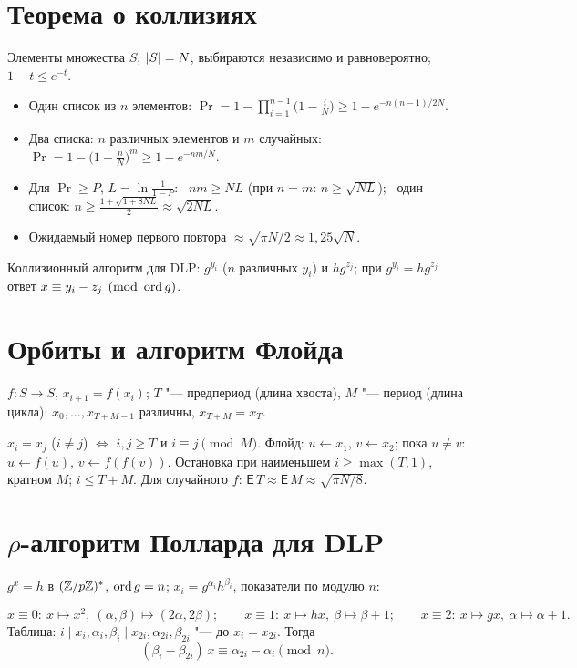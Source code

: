 \documentclass{ca-handout}
\begin{document}
\makehandouttitle

\section{Теорема о коллизиях}
Элементы множества $S$, $\lvert S\rvert = N$, выбираются независимо и равновероятно; $1 - t \le e^{-t}$.
\begin{reminder}[title={Вероятность коллизии}]
\begin{itemize}
  \item Один список из $n$ элементов:
    $\Pr = 1 - \prod_{i=1}^{n-1}\bigl(1 - \frac iN\bigr) \ge 1 - e^{-n(n-1)/2N}$.
  \item Два списка: $n$ различных элементов и $m$ случайных:
    $\Pr = 1 - \bigl(1 - \frac nN\bigr)^m \ge 1 - e^{-nm/N}$.
  \item Для $\Pr \ge P$, $L = \ln\frac{1}{1-P}$: \ $nm \ge NL$ (при $n = m$: $n \ge \sqrt{NL}$);
    \ один список: $n \ge \frac{1 + \sqrt{1 + 8NL}}{2} \approx \sqrt{2NL}$.
  \item Ожидаемый номер первого повтора $\approx \sqrt{\pi N/2} \approx 1{,}25\sqrt N$.
\end{itemize}
\end{reminder}
Коллизионный алгоритм для DLP: $g^{y_i}$ ($n$ различных $y_i$) и $h g^{z_j}$; при
$g^{y_i} = h g^{z_j}$ ответ $x \equiv y_i - z_j \pmod{\operatorname{ord} g}$.

\section{Орбиты и алгоритм Флойда}
$f\colon S \to S$, $x_{i+1} = f(x_i)$; $T$ "--- предпериод (длина хвоста), $M$ "--- период
(длина цикла): $x_0, \dots, x_{T+M-1}$ различны, $x_{T+M} = x_T$.
\begin{reminder}[title={Структура орбиты и цикл Флойда}]
$x_i = x_j$ ($i \ne j$) $\iff$ $i, j \ge T$ и $i \equiv j \pmod M$.
Флойд: $u \gets x_1$, $v \gets x_2$; пока $u \ne v$: $u \gets f(u)$, $v \gets f(f(v))$.
Остановка при наименьшем $i \ge \max(T, 1)$, кратном $M$; $i \le T + M$.
Для случайного $f$: $\mathsf{E}\,T \approx \mathsf{E}\,M \approx \sqrt{\pi N/8}$.
\end{reminder}

\section{\texorpdfstring{$\rho$}{ρ}-алгоритм Полларда для DLP}
$g^x = h$ в $(\mathbb{Z}/p\mathbb{Z})^{*}$, $\operatorname{ord} g = n$; $x_i = g^{\alpha_i} h^{\beta_i}$, показатели по модулю $n$:
\begin{reminder}[title={Шаг блуждания (разбиение по остатку $x \bmod 3$)}]
\[
  x \equiv 0:\ x \mapsto x^2,\ (\alpha, \beta) \mapsto (2\alpha, 2\beta); \qquad
  x \equiv 1:\ x \mapsto hx,\ \beta \mapsto \beta + 1; \qquad
  x \equiv 2:\ x \mapsto gx,\ \alpha \mapsto \alpha + 1.
\]
Таблица: $i \mid x_i, \alpha_i, \beta_i \mid x_{2i}, \alpha_{2i}, \beta_{2i}$ "--- до
$x_i = x_{2i}$. Тогда
\[
  (\beta_i - \beta_{2i})\,x \equiv \alpha_{2i} - \alpha_i \pmod n.
\]
\end{reminder}
\end{document}
